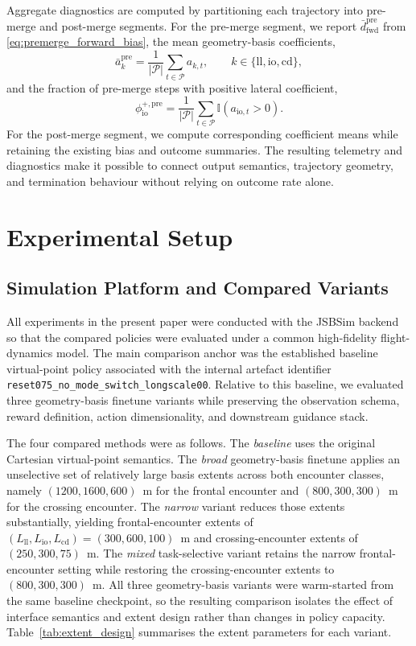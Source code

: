 \documentclass[drones,article,submit,pdftex,moreauthors]{Definitions/mdpi}
\begin{document}
Aggregate diagnostics are computed by partitioning each trajectory into pre-merge and post-merge segments. For the pre-merge segment, we report $\bar{d}_{\mathrm{fwd}}^{\mathrm{pre}}$ from \eqref{eq:premerge_forward_bias}, the mean geometry-basis coefficients,
\begin{equation}
\bar{a}_{k}^{\mathrm{pre}}
=
\frac{1}{|\mathcal{P}|}
\sum_{t \in \mathcal{P}} a_{k,t},
\qquad
k \in \{\mathrm{ll}, \mathrm{io}, \mathrm{cd}\},
\end{equation}
and the fraction of pre-merge steps with positive lateral coefficient,
\begin{equation}
\phi_{\mathrm{io}}^{+,\mathrm{pre}}
=
\frac{1}{|\mathcal{P}|}
\sum_{t \in \mathcal{P}} \mathbb{I}\!\left(a_{\mathrm{io},t} > 0\right).
\end{equation}
For the post-merge segment, we compute corresponding coefficient means while retaining the existing bias and outcome summaries. The resulting telemetry and diagnostics make it possible to connect output semantics, trajectory geometry, and termination behaviour without relying on outcome rate alone.

\section{Experimental Setup}

\subsection{Simulation Platform and Compared Variants}

All experiments in the present paper were conducted with the JSBSim backend so that the compared policies were evaluated under a common high-fidelity flight-dynamics model. The main comparison anchor was the established baseline virtual-point policy associated with the internal artefact identifier \texttt{reset075\_no\_mode\_switch\_longscale00}. Relative to this baseline, we evaluated three geometry-basis finetune variants while preserving the observation schema, reward definition, action dimensionality, and downstream guidance stack.

The four compared methods were as follows. The \emph{baseline} uses the original Cartesian virtual-point semantics. The \emph{broad} geometry-basis finetune applies an unselective set of relatively large basis extents across both encounter classes, namely $(1200,1600,600)$~m for the frontal encounter and $(800,300,300)$~m for the crossing encounter. The \emph{narrow} variant reduces those extents substantially, yielding frontal-encounter extents of $(L_{\mathrm{ll}},L_{\mathrm{io}},L_{\mathrm{cd}})=(300,600,100)$~m and crossing-encounter extents of $(250,300,75)$~m. The \emph{mixed} task-selective variant retains the narrow frontal-encounter setting while restoring the crossing-encounter extents to $(800,300,300)$~m. All three geometry-basis variants were warm-started from the same baseline checkpoint, so the resulting comparison isolates the effect of interface semantics and extent design rather than changes in policy capacity. Table~\ref{tab:extent_design} summarises the extent parameters for each variant.
\end{document}
